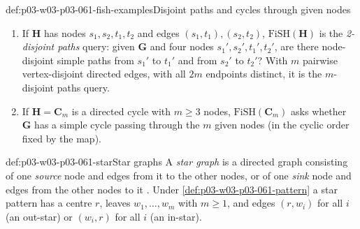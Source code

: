 \begin{hbexample}{def:p03-w03-p03-061-fish-examples}{Disjoint paths and cycles through given nodes}
\cite[Exs~8.15--8.16, pp.~77--78]{Kolaitis2003ExpressivePowerNotes}
\begin{enumerate}
\item If \(\mathbf H\) has nodes \(s_1,s_2,t_1,t_2\) and edges
      \((s_1,t_1),(s_2,t_2)\), \(\mathrm{FiSH}(\mathbf H)\) is the
      \emph{2-disjoint paths} query: given \(\mathbf G\) and four nodes
      \(s_1',s_2',t_1',t_2'\), are there node-disjoint simple paths from
      \(s_1'\) to \(t_1'\) and from \(s_2'\) to \(t_2'\)? With \(m\)
      pairwise vertex-disjoint directed edges, with all \(2m\) endpoints
      distinct, it is the \(m\)-disjoint paths query.
\item If \(\mathbf H=\mathbf C_m\) is a directed cycle with \(m\ge3\) nodes,
      \(\mathrm{FiSH}(\mathbf C_m)\) asks whether \(\mathbf G\) has a simple
      cycle passing through the \(m\) given nodes (in the cyclic order fixed
      by the map).
\end{enumerate}
\end{hbexample}

\begin{hbdefinition}{def:p03-w03-p03-061-star}{Star graphs}
A \emph{star graph} is a directed graph consisting of one \emph{source} node
and edges from it to the other nodes, or of one \emph{sink} node and edges
from the other nodes to it \cite[Def.~8.17, p.~78]{Kolaitis2003ExpressivePowerNotes}.
Under \cref{def:p03-w03-p03-061-pattern} a star pattern has a centre \(r\),
leaves \(w_1,\ldots,w_m\) with \(m\ge1\), and edges \((r,w_i)\) for all
\(i\) (an out-star) or \((w_i,r)\) for all \(i\) (an in-star).
\end{hbdefinition}

